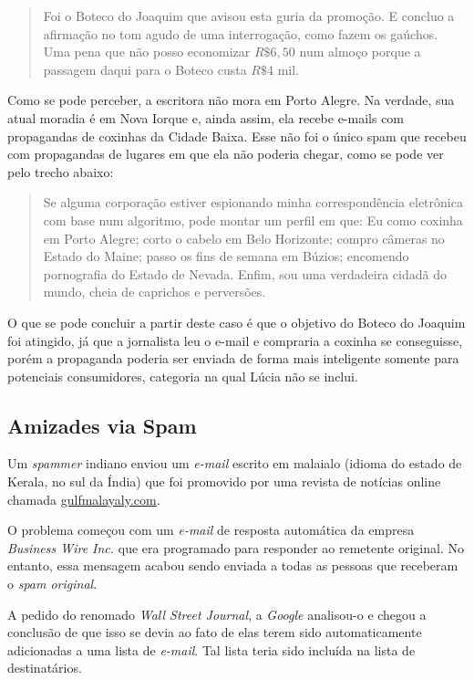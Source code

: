 \documentclass[a4paper,dvipdfm]{article}
\begin{document}
		\begin{quotation}
			Foi o Boteco do Joaquim que avisou esta guria da promoção. E concluo a afirmação no tom agudo de uma interrogação, como fazem os gaúchos. Uma pena que não posso economizar $R\$ 6,50$ num almoço porque a passagem daqui para o Boteco custa $R\$ 4$ mil.
		\end{quotation}

		Como se pode perceber, a escritora não mora em Porto Alegre.
		Na verdade, sua atual moradia é em Nova Iorque e, ainda assim, ela recebe e-mails com propagandas de coxinhas da Cidade Baixa.
		Esse não foi o único spam que recebeu com propagandas de lugares em que ela não poderia chegar, como se pode ver pelo trecho abaixo:

		\begin{quotation}
			Se alguma corporação estiver espionando minha correspondência eletrônica com base num algoritmo, pode montar um perfil em que: 
			Eu como coxinha em Porto Alegre; 
			corto o cabelo em Belo Horizonte; 
			compro câmeras no Estado do Maine; 
			passo os fins de semana em Búzios; 
			encomendo pornografia do Estado de Nevada. 
			Enfim, sou uma verdadeira cidadã do mundo, cheia de caprichos e perversões.
		\end{quotation}
			
		O que se pode concluir a partir deste caso é que o objetivo do Boteco do Joaquim foi atingido, já que a jornalista leu o e-mail e compraria a coxinha se conseguisse, porém a propaganda poderia ser enviada de forma mais inteligente somente para potenciais consumidores, categoria na qual Lúcia não se inclui.

	\subsection {Amizades via Spam}
		Um \emph{spammer} indiano enviou um \emph{e-mail} escrito em malaialo (idioma do estado de Kerala, no sul da Índia)
	que foi promovido por uma revista de notícias online chamada \url{gulfmalayaly.com}.

		O problema começou com um \emph{e-mail} de resposta automática da empresa \emph{Business Wire Inc.} que era programado
	para responder ao remetente original. No entanto, essa mensagem acabou sendo enviada a todas as pessoas que
	receberam o \emph{spam original}.

		A pedido do renomado \emph{Wall Street Journal}, a \emph{Google} analisou-o e chegou a
	conclusão de que isso se devia ao fato de elas terem sido automaticamente adicionadas a uma lista de \emph{e-mail}. Tal lista
	teria sido incluída na lista de destinatários.
\end{document}
